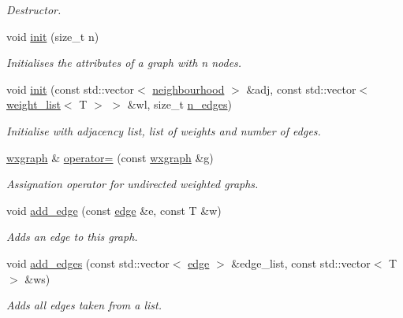 \begin{DoxyCompactItemize}
\begin{DoxyCompactList}\small\item\em Destructor. \end{DoxyCompactList}\item 
void \hyperlink{classlgraph_1_1wxgraph_aa09f37bf4a34a0f4f002587203df0125}{init} (size\-\_\-t n)
\begin{DoxyCompactList}\small\item\em Initialises the attributes of a graph with {\itshape n} nodes. \end{DoxyCompactList}\item 
void \hyperlink{classlgraph_1_1wxgraph_a851ab43d7658c185831413394ef915a9}{init} (const std\-::vector$<$ \hyperlink{namespacelgraph_a052e7766c13f3a43cec0aec8173fdede}{neighbourhood} $>$ \&adj, const std\-::vector$<$ \hyperlink{namespacelgraph_a1e0fd5ef0a78b2a92da48adbed265cb6}{weight\-\_\-list}$<$ T $>$ $>$ \&wl, size\-\_\-t \hyperlink{classlgraph_1_1xxgraph_a8ca991d1521cb6ba77e1cd3494ab42be}{n\-\_\-edges})
\begin{DoxyCompactList}\small\item\em Initialise with adjacency list, list of weights and number of edges. \end{DoxyCompactList}\item 
\hyperlink{classlgraph_1_1wxgraph}{wxgraph} \& \hyperlink{classlgraph_1_1wxgraph_a205fb7f32445d4caa36ee47609103e47}{operator=} (const \hyperlink{classlgraph_1_1wxgraph}{wxgraph} \&g)
\begin{DoxyCompactList}\small\item\em Assignation operator for undirected weighted graphs. \end{DoxyCompactList}\item 
void \hyperlink{classlgraph_1_1wxgraph_a6b2aab113f6ce118ff437c6c182d9c6c}{add\-\_\-edge} (const \hyperlink{namespacelgraph_a76bd7d50719f03de7a85db259d80d572}{edge} \&e, const T \&w)
\begin{DoxyCompactList}\small\item\em Adds an edge to this graph. \end{DoxyCompactList}\item 
void \hyperlink{classlgraph_1_1wxgraph_a73b0fd5a842fcc862e32e293901892ec}{add\-\_\-edges} (const std\-::vector$<$ \hyperlink{namespacelgraph_a76bd7d50719f03de7a85db259d80d572}{edge} $>$ \&edge\-\_\-list, const std\-::vector$<$ T $>$ \&ws)
\begin{DoxyCompactList}\small\item\em Adds all edges taken from a list. \end{DoxyCompactList}\item 

\end{DoxyCompactItemize}
